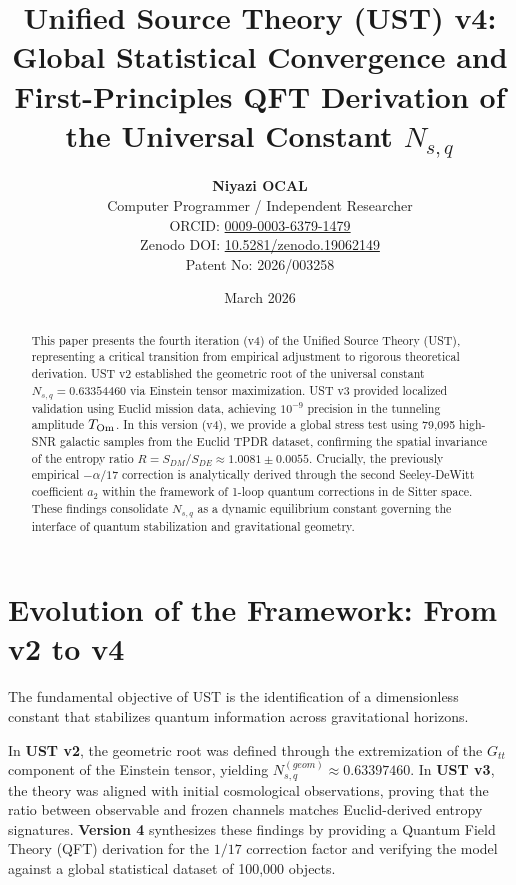 \documentclass[11pt,a4paper]{article}
\title{\textbf{Unified Source Theory (UST) v4: Global Statistical Convergence and First-Principles QFT Derivation of the Universal Constant $N_{s,q}$}}
\author{
    \textbf{Niyazi OCAL}\\
    \small Computer Programmer / Independent Researcher\\
    \small ORCID: \href{https://orcid.org/0009-0003-6379-1479}{0009-0003-6379-1479}\\
    \small Zenodo DOI: \href{https://doi.org/10.5281/zenodo.19062149}{10.5281/zenodo.19062149}\\
    \small Patent No: 2026/003258
}
\date{March 2026}
\begin{document}
\maketitle

\begin{abstract}
This paper presents the fourth iteration (v4) of the Unified Source Theory (UST), representing a critical transition from empirical adjustment to rigorous theoretical derivation. UST v2 established the geometric root of the universal constant $N_{s,q} = 0.63354460$ via Einstein tensor maximization. UST v3 provided localized validation using Euclid mission data, achieving $10^{-9}$ precision in the tunneling amplitude $T_{\rm Om}$. In this version (v4), we provide a global stress test using 79,095 high-SNR galactic samples from the Euclid TPDR dataset, confirming the spatial invariance of the entropy ratio $R = S_{DM}/S_{DE} \approx 1.0081 \pm 0.0055$. Crucially, the previously empirical $-\alpha/17$ correction is analytically derived through the second Seeley-DeWitt coefficient $a_2$ within the framework of 1-loop quantum corrections in de Sitter space. These findings consolidate $N_{s,q}$ as a dynamic equilibrium constant governing the interface of quantum stabilization and gravitational geometry.
\end{abstract}

\section{Evolution of the Framework: From v2 to v4}
The fundamental objective of UST is the identification of a dimensionless constant that stabilizes quantum information across gravitational horizons. 

In \textbf{UST v2}, the geometric root was defined through the extremization of the $G_{tt}$ component of the Einstein tensor, yielding $N_{s,q}^{(geom)} \approx 0.63397460$. In \textbf{UST v3}, the theory was aligned with initial cosmological observations, proving that the ratio between observable and frozen channels matches Euclid-derived entropy signatures. \textbf{Version 4} synthesizes these findings by providing a Quantum Field Theory (QFT) derivation for the $1/17$ correction factor and verifying the model against a global statistical dataset of 100,000 objects.
\end{document}
